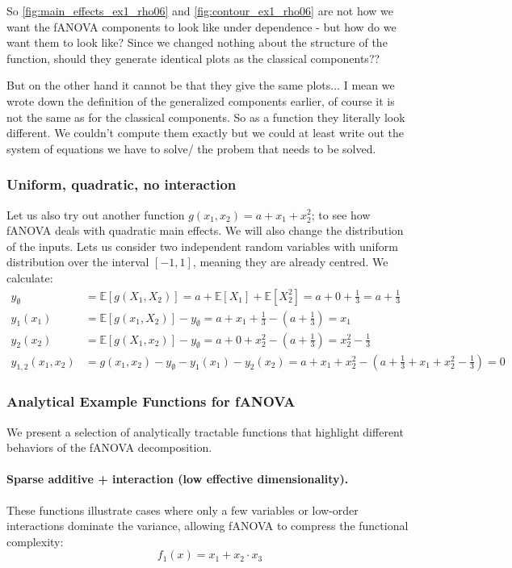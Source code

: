 So \autoref{fig:main_effects_ex1_rho06} and \autoref{fig:contour_ex1_rho06} are not how we want the fANOVA components to look like under dependence - but how do we want them to look like?
Since we changed nothing about the structure of the function, should they generate identical plots as the classical components??

But on the other hand it cannot be that they give the same plots... I mean we wrote down the definition of the generalized components earlier, of course it is not the same as for the classical components. So as a function they literally look different. We couldn't compute them exactly but we could at least write out the system of equations we have to solve/ the probem that needs to be solved.

\subsubsection*{Uniform, quadratic, no interaction}
Let us also try out another function $g(x_1, x_2) = a + x_1 + x_2^2$; to see how fANOVA deals with quadratic main effects. 
We will also change the distribution of the inputs. Lets us consider two independent random variables with uniform distribution over the interval \([-1, 1]\), meaning they are already centred. We calculate:
\begin{align*}
y_\emptyset &= \mathbb{E}[g(X_1, X_2)] = a + \mathbb{E}[X_1] + \mathbb{E}[X_2^2] = a + 0 + \tfrac{1}{3} = a + \tfrac{1}{3} \\
y_1(x_1) &= \mathbb{E}[g(x_1, X_2)] - y_\emptyset = a + x_1 + \tfrac{1}{3} - \left(a + \tfrac{1}{3}\right) = x_1 \\
y_2(x_2) &= \mathbb{E}[g(X_1, x_2)] - y_\emptyset = a + 0 + x_2^2 - \left(a + \tfrac{1}{3}\right) = x_2^2 - \tfrac{1}{3} \\
y_{1,2}(x_1, x_2) &= g(x_1, x_2) - y_\emptyset - y_1(x_1) - y_2(x_2) = a + x_1 + x_2^2 - \left(a + \tfrac{1}{3} + x_1 + x_2^2 - \tfrac{1}{3}\right) = 0
\end{align*}


\subsubsection*{Analytical Example Functions for fANOVA}

We present a selection of analytically tractable functions that highlight different behaviors of the fANOVA decomposition.

\paragraph{Sparse additive + interaction (low effective dimensionality).}
These functions illustrate cases where only a few variables or low-order interactions dominate the variance, allowing fANOVA to compress the functional complexity:
\[
f_1(x) = x_1 + x_2 \cdot x_3
\]

